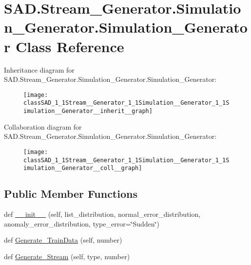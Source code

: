 \hypertarget{classSAD_1_1Stream__Generator_1_1Simulation__Generator_1_1Simulation__Generator}{}\section{S\+A\+D.\+Stream\+\_\+\+Generator.\+Simulation\+\_\+\+Generator.\+Simulation\+\_\+\+Generator Class Reference}
\label{classSAD_1_1Stream__Generator_1_1Simulation__Generator_1_1Simulation__Generator}


Inheritance diagram for S\+A\+D.\+Stream\+\_\+\+Generator.\+Simulation\+\_\+\+Generator.\+Simulation\+\_\+\+Generator\+:\nopagebreak
\begin{figure}[H]
\begin{center}
\leavevmode
\texttt{[image: classSAD\_1\_1Stream\_\_Generator\_1\_1Simulation\_\_Generator\_1\_1Simulation\_\_Generator\_\_inherit\_\_graph]}
\end{center}
\end{figure}


Collaboration diagram for S\+A\+D.\+Stream\+\_\+\+Generator.\+Simulation\+\_\+\+Generator.\+Simulation\+\_\+\+Generator\+:\nopagebreak
\begin{figure}[H]
\begin{center}
\leavevmode
\texttt{[image: classSAD\_1\_1Stream\_\_Generator\_1\_1Simulation\_\_Generator\_1\_1Simulation\_\_Generator\_\_coll\_\_graph]}
\end{center}
\end{figure}
\subsection*{Public Member Functions}
\begin{DoxyCompactItemize}
\item 
def \hyperlink{classSAD_1_1Stream__Generator_1_1Simulation__Generator_1_1Simulation__Generator_a2103b42b5bcb5cf441e74de526695f86}{\+\_\+\+\_\+init\+\_\+\+\_\+} (self, list\+\_\+distribution, normal\+\_\+error\+\_\+distribution, anomaly\+\_\+error\+\_\+distribution, type\+\_\+error=\char`\"{}Sudden\char`\"{})
\item 
def \hyperlink{classSAD_1_1Stream__Generator_1_1Simulation__Generator_1_1Simulation__Generator_a0ca784a29449c50c31db5a171ea3c378}{Generate\+\_\+\+Train\+Data} (self, number)
\item 
def \hyperlink{classSAD_1_1Stream__Generator_1_1Simulation__Generator_1_1Simulation__Generator_ab3812dceb7cec4fdac22dae14f72b793}{Generate\+\_\+\+Stream} (self, type, number)
\end{DoxyCompactItemize}
